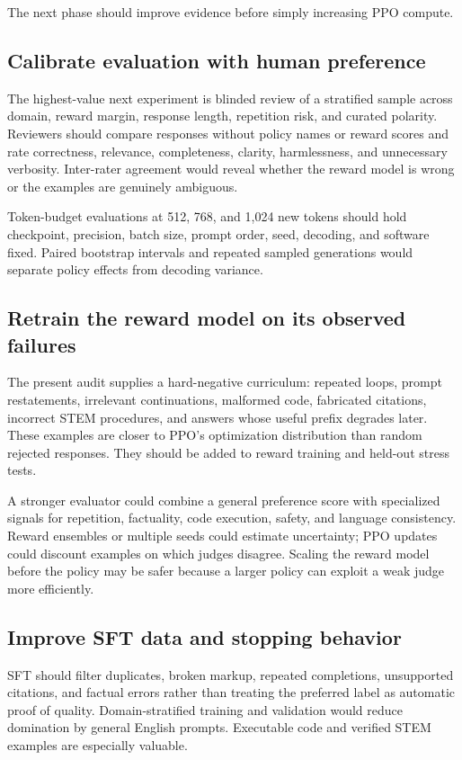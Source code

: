 \documentclass[11pt]{article}
\begin{document}
The next phase should improve evidence before simply increasing PPO compute.

\subsection{Calibrate evaluation with human preference}

The highest-value next experiment is blinded review of a stratified sample
across domain, reward margin, response length, repetition risk, and curated
polarity. Reviewers should compare responses without policy names or reward
scores and rate correctness, relevance, completeness, clarity, harmlessness,
and unnecessary verbosity. Inter-rater agreement would reveal whether the
reward model is wrong or the examples are genuinely ambiguous.

Token-budget evaluations at 512, 768, and 1,024 new tokens should hold
checkpoint, precision, batch size, prompt order, seed, decoding, and software
fixed. Paired bootstrap intervals and repeated sampled generations would
separate policy effects from decoding variance.

\subsection{Retrain the reward model on its observed failures}

The present audit supplies a hard-negative curriculum: repeated loops, prompt
restatements, irrelevant continuations, malformed code, fabricated citations,
incorrect STEM procedures, and answers whose useful prefix degrades later.
These examples are closer to PPO's optimization distribution than random
rejected responses. They should be added to reward training and held-out
stress tests.

A stronger evaluator could combine a general preference score with specialized
signals for repetition, factuality, code execution, safety, and language
consistency. Reward ensembles or multiple seeds could estimate uncertainty;
PPO updates could discount examples on which judges disagree. Scaling the
reward model before the policy may be safer because a larger policy can
exploit a weak judge more efficiently.

\subsection{Improve SFT data and stopping behavior}

SFT should filter duplicates, broken markup, repeated completions, unsupported
citations, and factual errors rather than treating the preferred label as
automatic proof of quality. Domain-stratified training and validation would
reduce domination by general English prompts. Executable code and verified
STEM examples are especially valuable.
\end{document}
